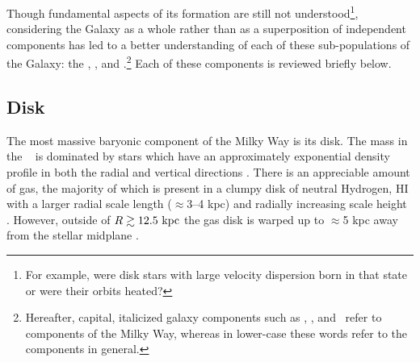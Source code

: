 Though fundamental aspects of its formation are still not understood\footnote{For example, were disk stars with large velocity dispersion born in that state or were their orbits heated?}, considering the Galaxy as a whole rather than as a superposition of independent components has led to a better understanding of each of these sub-populations of the Galaxy: the \mwdisk, \mwbulge, and \mwhalo.\footnote{Hereafter, capital, italicized galaxy components such as \mwdisk, \mwbulge, and \mwhalo\ refer to components of the Milky Way, whereas in lower-case these words refer to the components in general.} Each of these components is reviewed briefly below.

\subsection{Disk}

The most massive baryonic component of the Milky Way is its disk. The mass in the \mwdisk\ \citep[$M_d \approx 5 \times 10^{10}~\msun$;][]{mcmillan11} is dominated by stars which have an approximately exponential density profile in both the radial and vertical directions \citep[with scale lengths of $\approx$2--3 kpc and $\approx$250--800 pc, respectively, from thin to thick disk;][]{ojha01, juric08, mcmillan11, bovy12-spatialMAP}. There is an appreciable amount of gas, the majority of which is present in a clumpy disk of neutral Hydrogen, HI \citep[$M_{\rm HI} \approx 8 \times 10^9~\msun$;][]{kalberla09} with a larger radial scale length ($\approx$3--4 kpc) and radially increasing scale height \citep[$\approx$100 pc at $R=8~\kpc$ to $\approx$1 kpc at $R=25~\kpc$;][]{wouterloot90, merrifield92}. However, outside of $R \gtrsim 12.5~\mathrm{kpc}$ the gas disk is warped up to $\approx$5 kpc away from the stellar midplane \citep{henderson82, kalberla07}. 

